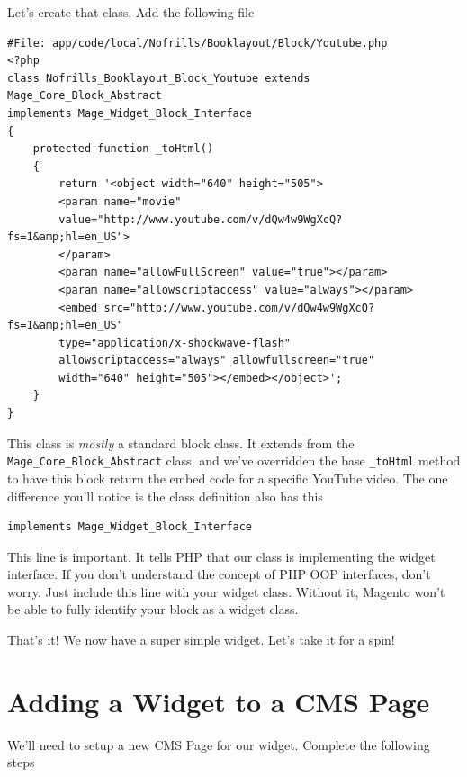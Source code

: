 \documentclass[oneside]{book}
\begin{document}
Let's create that class.  Add the following file

\begin{lstlisting}
#File: app/code/local/Nofrills/Booklayout/Block/Youtube.php
<?php
class Nofrills_Booklayout_Block_Youtube extends Mage_Core_Block_Abstract
implements Mage_Widget_Block_Interface
{
    protected function _toHtml()
    {
        return '<object width="640" height="505">
        <param name="movie" 
        value="http://www.youtube.com/v/dQw4w9WgXcQ?fs=1&amp;hl=en_US">
        </param>
        <param name="allowFullScreen" value="true"></param>
        <param name="allowscriptaccess" value="always"></param>
        <embed src="http://www.youtube.com/v/dQw4w9WgXcQ?fs=1&amp;hl=en_US"
        type="application/x-shockwave-flash" 
        allowscriptaccess="always" allowfullscreen="true" 
        width="640" height="505"></embed></object>';
    }
}

\end{lstlisting}


This class is \emph{mostly} a standard block class.  It extends from the \footnotesize\texttt{Mage\_Core\_Block\_Abstract} \normalsize  class, and we've overridden the base \footnotesize\texttt{\_toHtml} \normalsize  method to have this block return the embed code for a specific YouTube video.  The one difference you'll notice is the class definition also has this

\begin{lstlisting}
implements Mage_Widget_Block_Interface

\end{lstlisting}


This line is important.  It tells PHP that our class is implementing the widget interface.  If you don't understand the concept of PHP OOP interfaces, don't worry.  Just include this line with your widget class.  Without it, Magento won't be able to fully identify your block as a widget class.      

That's it!  We now have a super simple widget.  Let's take it for a spin!

\section{Adding a Widget to a CMS Page}

We'll need to setup a new CMS Page for our widget.  Complete the following steps
\end{document}
